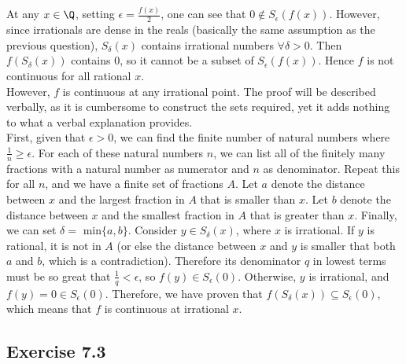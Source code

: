 \begin{solution}
 At any $x \in \Q$, setting $\epsilon = \frac{f(x)}{2}$, one can see that $0 \notin S_\epsilon(f(x))$. However, since irrationals are dense in the reals (basically the same assumption as the previous question), $S_\delta(x)$ contains irrational numbers $\forall \delta > 0$. Then $f(S_\delta(x))$ contains $0$, so it cannot be a subset of $S_\epsilon(f(x))$. Hence $f$ is not continuous for all rational $x$. \\
 However, $f$ is continuous at any irrational point. The proof will be described verbally, as it is cumbersome to construct the sets required, yet it adds nothing to what a verbal explanation provides. \\
 First, given that $\epsilon > 0$, we can find the finite number of natural numbers where $\frac{1}{n} \geq \epsilon$. For each of these natural numbers $n$, we can list all of the finitely many fractions with a natural number as numerator and $n$ as denominator. Repeat this for all $n$, and we have a finite set of fractions $A$. Let $a$ denote the distance between $x$ and the largest fraction in $A$ that is smaller than $x$. Let $b$ denote the distance between $x$ and the smallest fraction in $A$ that is greater than $x$. Finally, we can set $\delta =$ min$\{a,b\}$. Consider $y \in S_\delta(x)$, where $x$ is irrational. If $y$ is rational, it is not in $A$ (or else the distance between $x$ and $y$ is smaller that both $a$ and $b$, which is a contradiction). Therefore its denominator $q$ in lowest terms must be so great that $\frac{1}{q} < \epsilon$, so $f(y) \in S_\epsilon(0)$. Otherwise, $y$ is irrational, and $f(y) = 0 \in S_\epsilon(0)$. Therefore, we have proven that $f(S_\delta(x)) \subseteq S_\epsilon(0)$, which means that $f$ is continuous at irrational $x$.
\end{solution}

\subsection{Exercise 7.3}
\setcounter{question}{0}


